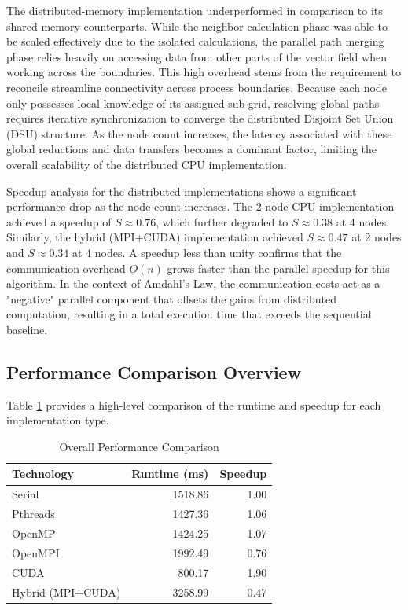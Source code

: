 The distributed-memory implementation underperformed in comparison to its shared memory counterparts.
While the neighbor calculation phase was able to be scaled effectively due to the isolated calculations, the parallel path merging phase relies heavily on accessing data from other parts of the vector field when working across the boundaries.
This high overhead stems from the requirement to reconcile streamline connectivity across process boundaries.
Because each node only possesses local knowledge of its assigned sub-grid, resolving global paths requires iterative synchronization to converge the distributed Disjoint Set Union (DSU) structure.
As the node count increases, the latency associated with these global reductions and data transfers becomes a dominant factor, limiting the overall scalability of the distributed CPU implementation.

Speedup analysis for the distributed implementations shows a significant performance drop as the node count increases.
The 2-node CPU implementation achieved a speedup of $S \approx 0.76$, which further degraded to $S \approx 0.38$ at 4 nodes.
Similarly, the hybrid (MPI+CUDA) implementation achieved $S \approx 0.47$ at 2 nodes and $S \approx 0.34$ at 4 nodes.
A speedup less than unity confirms that the communication overhead $O(n)$ grows faster than the parallel speedup for this algorithm.
In the context of Amdahl's Law, the communication costs act as a "negative" parallel component that offsets the gains from distributed computation, resulting in a total execution time that exceeds the sequential baseline.

\subsection{Performance Comparison Overview}

Table \ref{tab:perf_summary} provides a high-level comparison of the runtime and speedup for each implementation type.

\begin{table}[htbp]
	\centering
	\caption{Overall Performance Comparison}
	\label{tab:perf_summary}
	\begin{tabular}{|l|r|r|}
		\hline
		\textbf{Technology} & \textbf{Runtime (ms)} & \textbf{Speedup} \\ \hline
		Serial              & 1518.86               & 1.00             \\ \hline
		Pthreads            & 1427.36               & 1.06             \\ \hline
		OpenMP              & 1424.25               & 1.07             \\ \hline
		OpenMPI             & 1992.49               & 0.76             \\ \hline
		CUDA                & 800.17                & 1.90             \\ \hline
		Hybrid (MPI+CUDA)   & 3258.99               & 0.47             \\ \hline
	\end{tabular}
\end{table}

